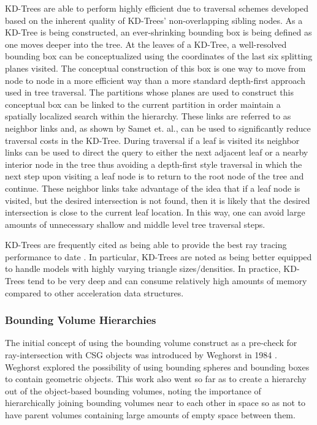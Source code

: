 KD-Trees are able to perform highly efficient due to traversal schemes developed
based on the inherent quality of KD-Trees' non-overlapping sibling nodes. As a
KD-Tree is being constructed, an ever-shrinking bounding box is being defined as
one moves deeper into the tree. At the leaves of a KD-Tree, a well-resolved
bounding box can be conceptualized using the coordinates of the last six
splitting planes visited. The conceptual construction of this box is one way to
move from node to node in a more efficient way than a more standard depth-first
approach used in tree traversal. The partitions whose planes are used to
construct this conceptual box can be linked to the current partition in order
maintain a spatially localized search within the hierarchy. These links are
referred to as neighbor links and, as shown by Samet et. al.\cite{Samet_1989},
can be used to significantly reduce traversal costs in the KD-Tree. During
traversal if a leaf is visited its neighbor links can be used to direct the
query to either the next adjacent leaf or a nearby interior node in the tree
thus avoiding a depth-first style traversal in which the next step upon visiting
a leaf node is to return to the root node of the tree and continue. These
neighbor links take advantage of the idea that if a leaf node is visited, but
the desired intersection is not found, then it is likely that the desired
intersection is close to the current leaf location. In this way, one can avoid
large amounts of unnecessary shallow and middle level tree traversal steps.

KD-Trees are frequently cited as being able to provide the best ray tracing
performance to date \cite{Ernst_2007,Hurley_2002,Havran_2000}. In particular,
KD-Trees are noted as being better equipped to handle models with highly varying
triangle sizes/densities. In practice, KD-Trees tend to be very deep and can
consume relatively high amounts of memory compared to other acceleration data
structures. 

\subsubsection{Bounding Volume Hierarchies}%
\label{subsec:BVH}
The initial concept of using the bounding volume construct as a pre-check for
ray-intersection with CSG objects was introduced by Weghorst in 1984
\cite{Weghorst_1984}. Weghorst explored the possibility of using bounding
spheres and bounding boxes to contain geometric objects. This work also went so
far as to create a hierarchy out of the object-based bounding volumes, noting the
importance of hierarchically joining bounding volumes near to each other in space
so as not to have parent volumes containing large amounts of empty space between them.

